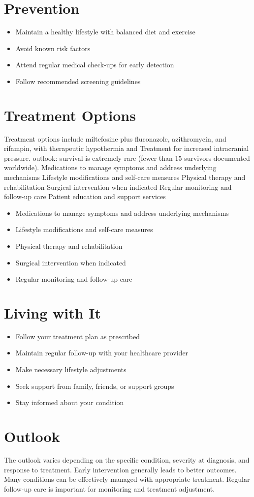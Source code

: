 \section{Prevention}
\begin{itemize}[noitemsep]
  \item Maintain a healthy lifestyle with balanced diet and exercise
  \item Avoid known risk factors
  \item Attend regular medical check-ups for early detection
  \item Follow recommended screening guidelines
\end{itemize}
\section{Treatment Options}
Treatment options include miltefosine plus fluconazole, azithromycin, and rifampin, with therapeutic hypothermia and Treatment for increased intracranial pressure. outlook: survival is extremely rare (fewer than 15 survivors documented worldwide). Medications to manage symptoms and address underlying mechanisms Lifestyle modifications and self-care measures Physical therapy and rehabilitation Surgical intervention when indicated Regular monitoring and follow-up care Patient education and support services

\begin{itemize}[noitemsep]
  \item Medications to manage symptoms and address underlying mechanisms
  \item Lifestyle modifications and self-care measures
  \item Physical therapy and rehabilitation
  \item Surgical intervention when indicated
  \item Regular monitoring and follow-up care
\end{itemize}
\section{Living with It}
\begin{itemize}[noitemsep]
  \item Follow your treatment plan as prescribed
  \item Maintain regular follow-up with your healthcare provider
  \item Make necessary lifestyle adjustments
  \item Seek support from family, friends, or support groups
  \item Stay informed about your condition
\end{itemize}
\section{Outlook}
The outlook varies depending on the specific condition, severity at diagnosis, and response to treatment. Early intervention generally leads to better outcomes. Many conditions can be effectively managed with appropriate treatment. Regular follow-up care is important for monitoring and treatment adjustment.
